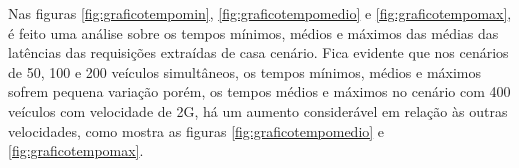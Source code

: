\documentclass[
	12pt,				%
	oneside,			%
	a4paper,			%
	english,			%
	brazil				%
	]{abntex2ppgsi}
\begin{document}


Nas figuras \ref{fig:graficotempomin},  \ref{fig:graficotempomedio} e  \ref{fig:graficotempomax}, é feito uma análise sobre os tempos mínimos, médios e máximos das médias das latências das requisições extraídas de casa cenário. Fica evidente que nos cenários de 50, 100 e 200 veículos simultâneos, os tempos mínimos, médios e máximos sofrem pequena variação porém, os tempos médios e máximos no cenário com 400 veículos com velocidade de 2G, há um aumento considerável em relação às outras velocidades, como mostra as figuras \ref{fig:graficotempomedio} e  \ref{fig:graficotempomax}.
\end{document}
